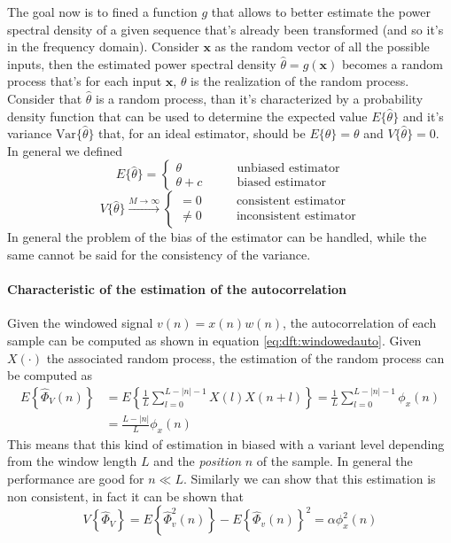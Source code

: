 	The goal now is to fined a function $g$ that allows to better estimate the power spectral density of a given sequence that's already been transformed (and so it's in the frequency domain). Consider $\boldsymbol x$ as the random vector of all the possible inputs, then the estimated power spectral density $\hat \theta = g(\boldsymbol x)$ becomes a random process that's for each input $\boldsymbol x$, $\theta$ is the realization of the random process.\\
	Consider that $\hat \theta$ is a random process, than it's characterized by a probability density function that can be used to determine the expected value $E\{\hat \theta\}$ and it's variance $\textrm{Var}\{\hat \theta\}$ that, for an ideal estimator, should be $E\{\hat \theta\} = \theta$ and $V\{\hat \theta\} = 0$. In general we defined
	\[ E \{\hat \theta\} = \begin{cases}
		\theta \qquad & \textrm{unbiased estimator} \\
		\theta + c\qquad & \textrm{biased estimator}
	\end{cases}\]
	\[ V\{ \hat \theta \} \xrightarrow{M\rightarrow \infty} \begin{cases}
		=0 \qquad & \textrm{consistent estimator} \\
		\neq 0 & \textrm{inconsistent estimator}
	\end{cases} \]
	In general the problem of the bias of the estimator can be handled, while the same cannot be said for the consistency of the variance. 
	
	\paragraph{Characteristic of the estimation of the autocorrelation} Given the windowed signal $v(n) = x(n) w(n)$, the autocorrelation of each sample can be computed as shown in equation \ref{eq:dft:windowedauto}. Given $X(\cdot)$ the associated random process, the estimation of the random process can be computed as
	\begin{align*}
		E\left\{\hat \Phi_V(n)\right\} & = E \left\{ \frac 1 L  \sum_{l=0}^{L-|n|-1} X(l) X(n+l) \right\} = \frac 1 L \sum_{l=0}^{L-|n|-1} \phi_x(n) \\
		& = \frac{L-|n|}{L} \phi_x(n)
 	\end{align*} 
	This means that this kind of estimation in biased with a variant level depending from the window length $L$ and the \textit{position} $n$ of the sample. In general the performance are good for $n\ll L$. Similarly we can show that this estimation is non consistent, in fact it can be shown that
	\[ V\left\{ \hat \Phi_V \right\} = E\left\{ \hat \Phi_v^2(n) \right\} - E\left\{ \hat \Phi_v(n) \right\}^2 = \alpha \phi_x^2(n) \]
	
